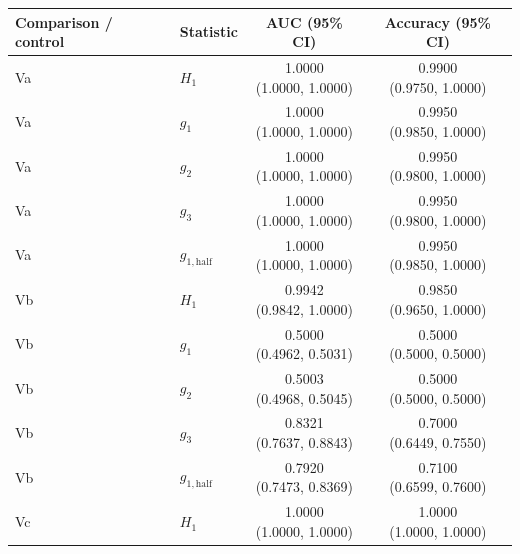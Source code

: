 \begin{tabular}{llcc}
\toprule
Comparison / control & Statistic & AUC (95\% CI) & Accuracy (95\% CI) \\
\midrule
Va & $H_1$ & \shortstack{1.0000\\(1.0000, 1.0000)} & \shortstack{0.9900\\(0.9750, 1.0000)} \\[3pt]
Va & $g_1$ & \shortstack{1.0000\\(1.0000, 1.0000)} & \shortstack{0.9950\\(0.9850, 1.0000)} \\[3pt]
Va & $g_2$ & \shortstack{1.0000\\(1.0000, 1.0000)} & \shortstack{0.9950\\(0.9800, 1.0000)} \\[3pt]
Va & $g_3$ & \shortstack{1.0000\\(1.0000, 1.0000)} & \shortstack{0.9950\\(0.9800, 1.0000)} \\[3pt]
Va & $g_{1,\mathrm{half}}$ & \shortstack{1.0000\\(1.0000, 1.0000)} & \shortstack{0.9950\\(0.9850, 1.0000)} \\[3pt]
Vb & $H_1$ & \shortstack{0.9942\\(0.9842, 1.0000)} & \shortstack{0.9850\\(0.9650, 1.0000)} \\[3pt]
Vb & $g_1$ & \shortstack{0.5000\\(0.4962, 0.5031)} & \shortstack{0.5000\\(0.5000, 0.5000)} \\[3pt]
Vb & $g_2$ & \shortstack{0.5003\\(0.4968, 0.5045)} & \shortstack{0.5000\\(0.5000, 0.5000)} \\[3pt]
Vb & $g_3$ & \shortstack{0.8321\\(0.7637, 0.8843)} & \shortstack{0.7000\\(0.6449, 0.7550)} \\[3pt]
Vb & $g_{1,\mathrm{half}}$ & \shortstack{0.7920\\(0.7473, 0.8369)} & \shortstack{0.7100\\(0.6599, 0.7600)} \\[3pt]
Vc & $H_1$ & \shortstack{1.0000\\(1.0000, 1.0000)} & \shortstack{1.0000\\(1.0000, 1.0000)} \\[3pt]

\end{tabular}
